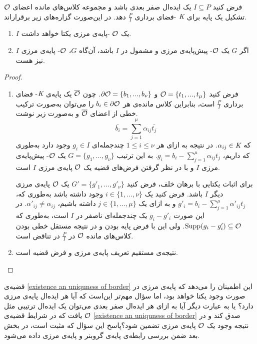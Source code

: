 \begin{theorem}
	\label{existence an uniquness of border}
فرض کنید 
$I\subseteq P$
یک ایده‌ال صفر بعدی باشد و مجموعه‌ کلاس‌های مانده اعضای 
${\mathcal O}$
تشکیل یک پایه برای 
$\textit{K}$
-فضای برداری 
$\frac{P}{I}$
دهد. در این‌صورت گزاره‌های زیر برقراراند.
\begin{enumerate}
\item
$I$
یک 
${\mathcal O}$
-پایه‌ی مرزی یکتا خواهد داشت.
\item
اگر 
$G$
یک 
${\mathcal O}$-
پیش‌پایه‌ی مرزی و مشمول در 
$I$
باشد، آن‌گاه 
$G$،
${\mathcal O}$-
پایه‌ی مرزی 
$I$
نیز هست.
\end{enumerate}
\end{theorem}
\begin{proof}
\begin{enumerate}
\item
فرض کنید 
${\mathcal O} = \{t_{1},...,t_{\mu}\}$
و
$\partial\mathcal{O} = \{b_{1},...,b_{\nu}\}$.
چون 
$\overline{{\mathcal O}}$
یک پایه‌ی 
$\textit{K}$-
فضای برداری 
$\frac{P}{I}$
است، بنابراین کلاس مانده‌ی هر 
$b_{i}\in \partial\mathcal{O}$
را می‌توان به‌صورت ترکیب خطی از اعضای 
$\overline{{\mathcal O}}$
و به‌صورت زیر نوشت.
$$\bar{b_{i}} = \sum_{j = 1}^{\mu}\alpha_{ij}\bar{t_{j}}$$
که 
$\alpha_{ij}\in \textit{K}$.
در نتیجه به ازای هر 
$1\leq i\leq \nu$
چندجمله‌ای 
$g_{i}\in I$
وجود دارد به‌طوری که داریم،
$g_{i} = b_{i} - \sum_{j = 1}^{\mu}\alpha_{ij}t_{j}$.
به این ترتیب 
$G = \{g_{1},...,g_{\nu}\}$
یک
${\mathcal O}$-
پیش‌پایه‌ی مرزی 
$I$
و با در نظر گرفتن فرض‌های قضیه یک 
${\mathcal O}$
پایه‌ی مرزی 
$I$
است.

برای اثبات یکتایی با برهان خلف، فرض کنید 
$G' = \{g'_{1},...,g'_{\nu}\}$
یک 
${\mathcal O}$
‌پایه‌ی مرزی دیگر
$I$
باشد. فرض کنید یک 
$i\in\{1,...,\nu\}$ 
وجود داشته باشد به‌طوری که، 
$g'_{i} = b_{i} - \sum_{j = 1}^{\mu}\alpha'_{ij}t_{j}$
و به ازای یک 
$j\in\{1,...,\mu\}$
داشته باشیم،
$\alpha'_{ij}\neq \alpha_{ij}$.
در این صورت 
$g_{i} - g'_{i}$
یک چند‌جمله‌ای ناصفر در 
$I$
است، به‌طوری که 
$\operatorname{\mathrm{Supp}}(g_{i}-g'_{i})\subseteq {\mathcal O}$.
ولی این با فرض پایه بودن و در نتیجه مستقل خطی بودن کلاس‌های مانده 
${\mathcal O}$
در 
$\frac{P}{I}$
در تناقض است.
\item
نتیجه‌ی مستقیم تعریف پایه‌ی مرزی و فرض قضیه است. 

\end{enumerate}
\end{proof}
قضیه‌ی 
\ref{existence an uniquness of border}
این اطمینان را می‌دهد که پایه‌ی مرزی در صورت وجود یکتا خواهد بود، اما سؤال مهم‌تر این‌است که آیا هر ایده‌ال پایه‌ی مرزی دارد؟ یا به عبارت دیگر آیا به ازای هر ایده‌ال صفر بعدی می‌توان یک ایده‌ال ترتیبی مثل 
${\mathcal O}$
یافت که در شرایط قضیه‌ی 
\ref{existence an uniquness of border}
صدق کند و در نتیجه وجود یک 
${\mathcal O}$
پایه‌ی مرزی تضمین شود؟پاسخ این سؤال که مثبت است، در بخش بعد ضمن بررسی رابطه‌ی پایه‌ی گروبنر و پایه‌ی مرزی داده می‌شود.

